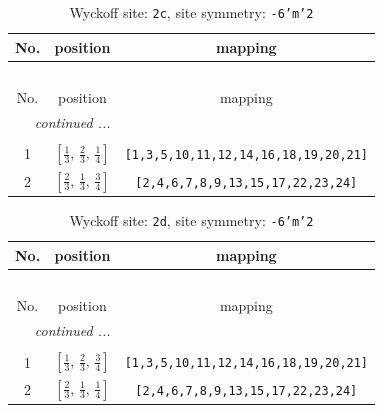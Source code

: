 \documentclass[fleqn,8pt]{jsarticle}
\begin{document}
\renewcommand{\arraystretch}{1.2}
\begin{longtable}{ccc}
\caption{Wyckoff site: {\tt 2c}, site symmetry: {\tt -6'm'2}}
 \\
 \hline \hline
No. & position & mapping \\ \hline \endfirsthead

\multicolumn{2}{l}{\tablename\ \thetable{}} \\
 \hline \hline
No. & position & mapping \\ \hline \endhead

 \hline \hline
\multicolumn{2}{r}{\footnotesize\it continued ...} \\ \endfoot

 \hline \hline
\multicolumn{2}{r}{} \\ \endlastfoot

1 & $\left[ \frac{1}{3},\, \frac{2}{3},\, \frac{1}{4} \right]$ & {\tt [1,3,5,10,11,12,14,16,18,19,20,21]} \\ \hline
2 & $\left[ \frac{2}{3},\, \frac{1}{3},\, \frac{3}{4} \right]$ & {\tt [2,4,6,7,8,9,13,15,17,22,23,24]} \\
\end{longtable}
\renewcommand{\arraystretch}{1.2}
\begin{longtable}{ccc}
\caption{Wyckoff site: {\tt 2d}, site symmetry: {\tt -6'm'2}}
 \\
 \hline \hline
No. & position & mapping \\ \hline \endfirsthead

\multicolumn{2}{l}{\tablename\ \thetable{}} \\
 \hline \hline
No. & position & mapping \\ \hline \endhead

 \hline \hline
\multicolumn{2}{r}{\footnotesize\it continued ...} \\ \endfoot

 \hline \hline
\multicolumn{2}{r}{} \\ \endlastfoot

1 & $\left[ \frac{1}{3},\, \frac{2}{3},\, \frac{3}{4} \right]$ & {\tt [1,3,5,10,11,12,14,16,18,19,20,21]} \\ \hline
2 & $\left[ \frac{2}{3},\, \frac{1}{3},\, \frac{1}{4} \right]$ & {\tt [2,4,6,7,8,9,13,15,17,22,23,24]} \\
\end{longtable}
\renewcommand{\arraystretch}{1.2}
\end{document}

